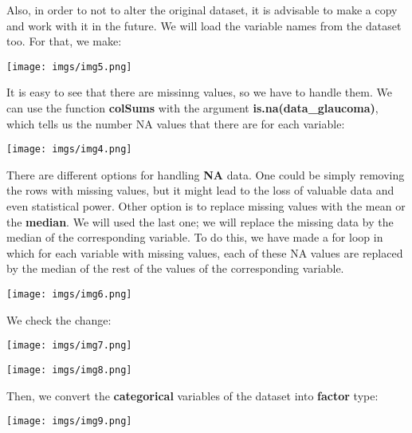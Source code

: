 \documentclass{article}
\begin{document}
Also, in order to not to alter the original dataset, it is advisable to make a copy and work with it in the
future. We will load the variable names from the dataset too. For that, we make:

\begin{center}
    {\texttt{[image: imgs/img5.png]}\par}
\end{center}

It is easy to see that there are missinng values, so we have to handle them. We can use the 
function \textbf{colSums} with the argument \textbf{is.na(data\_glaucoma)}, which tells us the number
NA values that there are for each variable:

\begin{center}
    {\texttt{[image: imgs/img4.png]}\par}
\end{center}


There are different options for handling \textbf{NA} data. One could be simply removing the rows with missing values, but
it might lead to the loss of valuable data and even statistical power. Other option is to replace missing values
with the mean or the \textbf{median}. We will used the last one; we will replace the missing data by the median of the
corresponding variable. To do this, we have made a for loop in which for each variable with missing values, each of
these NA values are replaced by the median of the rest of the values of the corresponding variable. 

\begin{center}
    {\texttt{[image: imgs/img6.png]}\par}
\end{center}

We check the change:

\begin{center}
    {\texttt{[image: imgs/img7.png]}\par}

    {\texttt{[image: imgs/img8.png]}\par}
\end{center}


Then, we convert the \textbf{categorical} variables of the dataset into \textbf{factor} type:

\begin{center}
    {\texttt{[image: imgs/img9.png]}\par}
\end{center}
\end{document}
